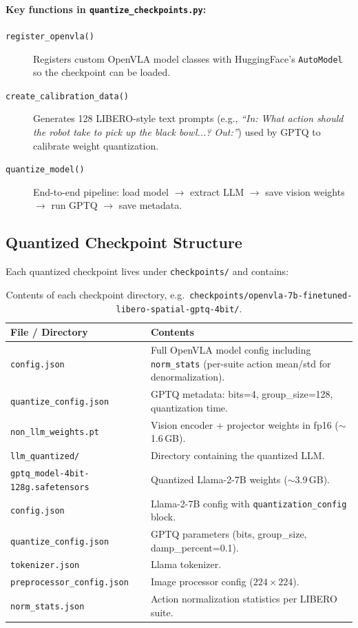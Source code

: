 \documentclass[11pt,a4paper]{article}
\begin{document}
\paragraph{Key functions in \texttt{quantize\_checkpoints.py}:}
\begin{description}
  \item[\texttt{register\_openvla()}] Registers custom OpenVLA model classes with HuggingFace's \texttt{AutoModel} so the checkpoint can be loaded.
  \item[\texttt{create\_calibration\_data()}] Generates 128 LIBERO-style text prompts (e.g., \textit{``In: What action should the robot take to pick up the black bowl...? Out:''}) used by GPTQ to calibrate weight quantization.
  \item[\texttt{quantize\_model()}] End-to-end pipeline: load model $\rightarrow$ extract LLM $\rightarrow$ save vision weights $\rightarrow$ run GPTQ $\rightarrow$ save metadata.
\end{description}

\subsection{Quantized Checkpoint Structure}

Each quantized checkpoint lives under \texttt{checkpoints/} and contains:

\begin{table}[h]
\centering
\begin{tabular}{@{}p{6.5cm}p{8cm}@{}}
\toprule
\textbf{File / Directory} & \textbf{Contents} \\
\midrule
\texttt{config.json}               & Full OpenVLA model config including \texttt{norm\_stats} (per-suite action mean/std for denormalization). \\
\texttt{quantize\_config.json}     & GPTQ metadata: bits=4, group\_size=128, quantization time. \\
\texttt{non\_llm\_weights.pt}      & Vision encoder + projector weights in fp16 ($\sim$1.6\,GB). \\
\texttt{llm\_quantized/}           & Directory containing the quantized LLM. \\
\quad \texttt{gptq\_model-4bit-128g.safetensors} & Quantized Llama-2-7B weights ($\sim$3.9\,GB). \\
\quad \texttt{config.json}         & Llama-2-7B config with \texttt{quantization\_config} block. \\
\quad \texttt{quantize\_config.json} & GPTQ parameters (bits, group\_size, damp\_percent=0.1). \\
\texttt{tokenizer.json}            & Llama tokenizer. \\
\texttt{preprocessor\_config.json} & Image processor config ($224\times224$). \\
\texttt{norm\_stats.json}          & Action normalization statistics per LIBERO suite. \\
\bottomrule
\end{tabular}
\caption{Contents of each checkpoint directory, e.g.\ \texttt{checkpoints/openvla-7b-finetuned-libero-spatial-gptq-4bit/}.}
\end{table}
\end{document}
